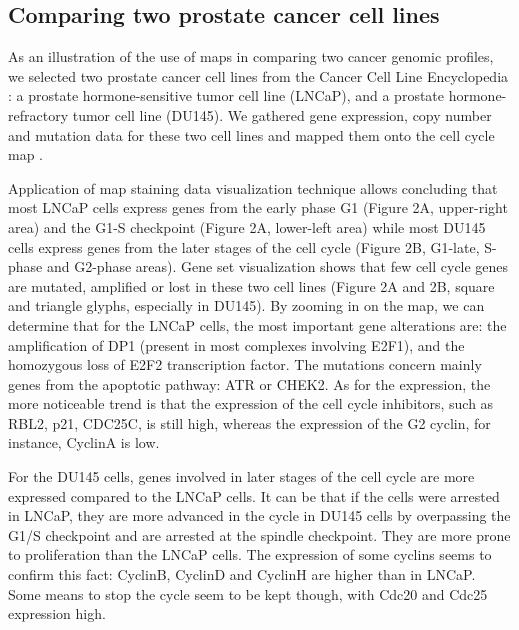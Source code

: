 \documentclass[a4,center,fleqn]{NAR}
\begin{document}
\subsection{Comparing two prostate cancer cell lines}

As an illustration of the use of maps in comparing two cancer genomic profiles, we
selected two prostate cancer cell lines from the Cancer Cell Line Encyclopedia
\cite{barretina2012cancer}: a prostate hormone-sensitive
tumor cell line (LNCaP), and a prostate hormone-refractory tumor cell line
(DU145). We gathered gene expression, copy number and mutation data for
these two cell lines and mapped them onto the cell cycle map
\cite{calzone2008comprehensive}.

Application of map staining data visualization technique allows concluding that
most LNCaP cells express genes from the early phase G1 (Figure 2A, upper-right area) and the G1-S checkpoint
(Figure 2A, lower-left area) while most DU145 cells express genes from the
later stages of the cell cycle (Figure 2B, G1-late, S-phase and G2-phase
areas). Gene set visualization shows that few cell cycle genes are mutated, amplified or lost
in these two cell lines (Figure 2A and 2B, square and triangle glyphs, especially in DU145).
By zooming in on the map, we can determine that for the LNCaP cells, the most
important gene alterations are: the amplification of DP1 (present in most
complexes involving E2F1), and the homozygous loss of E2F2 transcription
factor. The mutations concern mainly genes from the apoptotic pathway: ATR or
CHEK2. As for the expression, the more noticeable trend is that the expression
of the cell cycle inhibitors, such as RBL2, p21, CDC25C, is still high, whereas
the expression of the G2 cyclin, for instance, CyclinA is low.

For the DU145 cells, genes involved in later stages of the cell cycle are more
expressed compared to the LNCaP cells. It can be that if the cells were
arrested in LNCaP, they are more advanced in the cycle in DU145 cells by
overpassing the G1/S checkpoint and are arrested at the spindle checkpoint.
They are more prone to proliferation than the LNCaP cells. The expression of some
cyclins seems to confirm this fact: CyclinB, CyclinD and CyclinH are higher
than in LNCaP. Some means to stop the cycle seem to be kept though, with Cdc20
and Cdc25 expression high.

\end{document}
